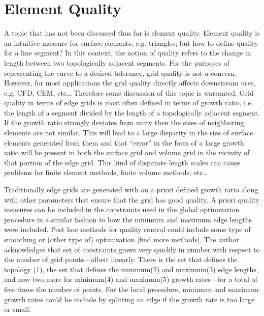 \section{Element Quality}
A topic that has not been discussed thus far is element quality.  Element quality is an intuitive measure for surface elements, e.g. triangles; but how to define quality for a line segment?  In this context, the notion of quality refers to the change in length between two topologically adjacent segments.  For the purposes of representing the curve to a desired tolerance, grid quality is not a concern.  However, for most applications the grid quality directly affects downstream uses, e.g. CFD, CEM, etc…  Therefore some discussion of this topic is warranted.  Grid quality in terms of edge grids is most often defined in terms of growth ratio, i.e. the length of a segment divided by the length of a topologically adjacent segment.  If the growth ratio strongly deviates from unity then the sizes of neighboring elements are not similar.  This will lead to a large disparity in the size of surface elements generated from them and that “error” in the form of a large growth ratio will be present in both the surface grid and volume grid in the vicinity of that portion of the edge grid.  This kind of disparate length scales can cause problems for finite element methods, finite volume methods, etc…

        Traditionally edge grids are generated with an a priori defined growth ratio along with other parameters that ensure that the grid has good quality.  A priori quality measures can be included in the constraints used in the global optimization procedure in a similar fashion to how the minimum and maximum edge lengths were included.  Post hoc methods for quality control could include some type of smoothing or (other type of) optimization [find more methods].  The author acknowledges that set of constraints grows very quickly in number with respect to the number of grid points—albeit linearly.  There is the set that defines the topology (1), the set that defines the minimum(2) and maximum(3) edge lengths, and now two more for minimum(4) and maximum(5) growth rates—for a total of five times the number of points.  For the local procedure, minimum and maximum growth rates could be include by splitting an edge if the growth rate is too large or small.

